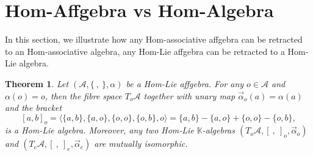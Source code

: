 \documentclass[14pt]{article}
\newtheorem{Thm}[thm]{Theorem}
\theoremstyle{Definition}
\theoremstyle{remark}
\begin{document}
\section{Hom-Affgebra vs Hom-Algebra}
In this section, we illustrate how any Hom-associative affgebra can be retracted to an Hom-associative algebra, any Hom-Lie affgebra can be retracted to a Hom-Lie algebra.
\begin{Thm}\label{Thm10}
Let $(\mathcal{A},\{~,~\},\alpha)$ be a Hom-Lie affgebra. For any $o\in\mathcal{A}$ and $\alpha(o)=o$, then the fibre space $T_{o}\mathcal{A}$ together with unary map $\overrightarrow{\alpha}_{o}(a)=\alpha(a)$ and the bracket
\begin{equation}\label{eq20}
[a,b]_{o}=\langle \{a,b\},\{a,o\},\{o,o\},\{o,b\},o\rangle=\{a,b\}-\{a,o\}+\{o,o\}-\{o,b\},
\end{equation}
is a Hom-Lie algebra. Moreover, any two Hom-Lie $\mathbb{K}$-algebras $(T_{o}\mathcal{A},[~,~]_{o},\overrightarrow{\alpha}_{o})$ and $(T_{e}\mathcal{A},[~,~]_{e},\overrightarrow{\alpha}_{e})$ are mutually isomorphic.
\end{Thm}
\end{document}
